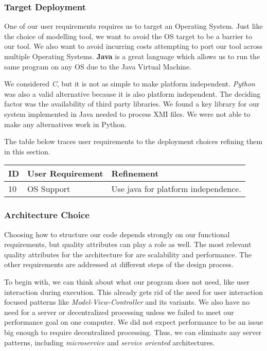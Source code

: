 \documentclass[11pt]{article}
\begin{document}
    \newpage
    \subsubsection{Target Deployment}
    One of our user requirements requires us to target an Operating System.
    Just like the choice of modelling tool, we want to avoid the OS target to be a barrier to our tool.
    We also want to avoid incurring costs attempting to port our tool across multiple Operating Systems.
    \textbf{Java} is a great language which allows us to run the same program on any OS due to the Java Virtual Machine.

    We considered \textit{C}, but it is not as simple to make platform independent.
    \textit{Python} was also a valid alternative because it is also platform independent.
    The deciding factor was the availability of third party libraries.
    We found a key library for our system implemented in Java needed to process XMI files.
    We were not able to make any alternatives work in Python.

    The table below traces user requirements to the deployment choices refining them in this section.
    \begin{table}[htbp]
        \centering
        \begin{tabularx}{\textwidth}{| l | l | X |}
            \hline
            \textbf{ID} & \textbf{User Requirement} & \textbf{Refinement} \\
            \hline
            10 & OS Support & Use java for platform independence. \\ \hline
        \end{tabularx}\label{tab:os-choice-table}
    \end{table}

    \newpage
    \subsubsection{Architecture Choice}
    Choosing how to structure our code depends strongly on our functional requirements,
    but quality attributes can play a role as well.
    The most relevant quality attributes for the architecture for are scalability and performance.
    The other requirements are addressed at different steps of the design process.

    To begin with, we can think about what our program does not need, like user interaction during execution.
    This already gets rid of the need for user interaction focused patterns like \textit{Model-View-Controller} and its variants.
    We also have no need for a server or decentralized processing unless we failed to meet our performance goal on one computer.
    We did not expect performance to be an issue big enough to require decentralized processing.
    Thus, we can eliminate any server patterns, including \textit{microservice} and \textit{service oriented} architectures.
\end{document}
